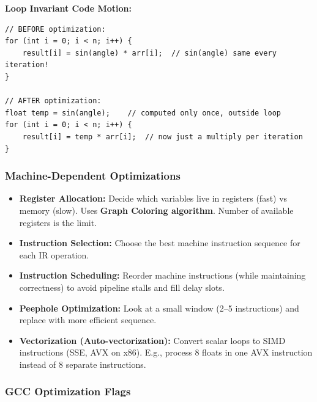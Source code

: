 \documentclass[11pt,a4paper]{article}
\newcommand{\term}[1]{\textbf{\color{darkblue}#1}}
\begin{document}
\begin{myexample}
\textbf{Loop Invariant Code Motion:}
\begin{lstlisting}
// BEFORE optimization:
for (int i = 0; i < n; i++) {
    result[i] = sin(angle) * arr[i];  // sin(angle) same every iteration!
}

// AFTER optimization:
float temp = sin(angle);    // computed only once, outside loop
for (int i = 0; i < n; i++) {
    result[i] = temp * arr[i];  // now just a multiply per iteration
}
\end{lstlisting}
\end{myexample}

\subsubsection{Machine-Dependent Optimizations}

\begin{itemize}[noitemsep]
  \item \term{Register Allocation:} Decide which variables live in registers (fast) vs memory (slow). Uses \textbf{Graph Coloring algorithm}. Number of available registers is the limit.
  \item \term{Instruction Selection:} Choose the best machine instruction sequence for each IR operation.
  \item \term{Instruction Scheduling:} Reorder machine instructions (while maintaining correctness) to avoid pipeline stalls and fill delay slots.
  \item \term{Peephole Optimization:} Look at a small window (2--5 instructions) and replace with more efficient sequence.
  \item \term{Vectorization (Auto-vectorization):} Convert scalar loops to SIMD instructions (SSE, AVX on x86). E.g., process 8 floats in one AVX instruction instead of 8 separate instructions.
\end{itemize}

\subsubsection{GCC Optimization Flags}
\end{document}
